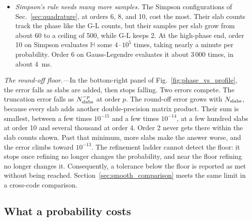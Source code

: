 \documentclass[final,5p,times,twocolumn,sort,compress]{elsarticle}
\makeatletter
\newcommand{\fig}{Fig.}
\DeclareRobustCommand{\_}{%
  \ifmmode\nfss@text{\textunderscore}\else\textunderscore\allowbreak\fi}
\newcommand{\figu}[1]{\fig~\ref{fig:#1}}
\makeatother
\begin{document}
\begin{itemize}
\item \textit{Simpson's rule needs many more samples.} The Simpson configurations of Sec.~\ref{sec:quadrature}, at orders 6, 8, and 10, cost the most. Their slab counts track the phase like the G-L counts, but their samples per slab grow from about 60 to a ceiling of 500, while G-L keeps 2. At the high-phase end, order 10 on Simpson evaluates $\mathbb{H}$ some $4 \cdot 10^{5}$ times, taking nearly a minute per probability. Order 6 on Gauss-Legendre evaluates it about 3\,000 times, in about 4~ms.
\end{itemize}

\smallskip

\textit{The round-off floor.---}In the bottom-right panel of \figu{phase_vs_profile}, the error falls as slabs are added, then stops falling. Two errors compete. The truncation error falls as $N_{\rm slabs}^{-p}$ at order $p$. The round-off error grows with $N_{\rm slabs}$, because every slab adds another double-precision matrix product. Their sum is smallest, between a few times $10^{-15}$ and a few times $10^{-14}$, at a few hundred slabs at order 10 and several thousand at order 4. Order 2 never gets there within the slab counts shown. Past that minimum, more slabs make the answer worse, and the error climbs toward $10^{-13}$. The refinement ladder cannot detect the floor: it stops once refining no longer changes the probability, and near the floor refining no longer changes it. Consequently, a tolerance below the floor is reported as met without being reached. Section~\ref{sec:smooth_comparison} meets the same limit in a cross-code comparison.


\subsection{What a probability costs}
\label{sec:cost}
\end{document}
